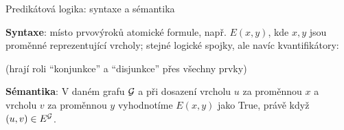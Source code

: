 \documentclass{beamer}
\begin{document}
\begin{frame}{Predikátová logika: syntaxe a sémantika}

    \textbf{Syntaxe}: místo prvovýroků \alert{atomické formule}, např. $E(x,y)$, kde $x,y$ jsou \alert{proměnné} reprezentující vrcholy; stejné logické spojky, ale navíc \alert{kvantifikátory}:
  
    \pause

    \pause
    (hrají roli ``konjunkce'' a ``disjunkce'' přes všechny prvky)
    
    \pause
    \bigskip


    \pause
    \bigskip

    \textbf{Sémantika}: V daném grafu \(\mathcal{G}\) a při \alert{dosazení} vrcholu \(u\) za proměnnou \(x\) a vrcholu \(v\) za proměnnou \(y\) \alert{vyhodnotíme} \( E(x,y) \) jako \alert{True}, právě když \alert{\( (u,v)\in E^{\mathcal{G}} \)}.
        
\end{frame}
\end{document}
